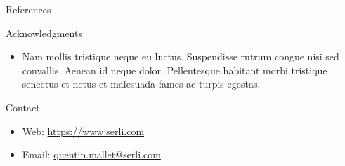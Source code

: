 \documentclass[final,hyperref={pdfpagelabels=false}]{beamer}
\begin{document}
\begin{frame}[t]
\begin{columns}[t]
\begin{column}{.465\textwidth}
\begin{block}{References}
\nocite{*} %
\small{
}

\end{block}


\begin{block}{Acknowledgments}

\begin{itemize}
\item Nam mollis tristique neque eu luctus. Suspendisse rutrum congue nisi sed convallis. Aenean id neque dolor. Pellentesque habitant morbi tristique senectus et netus et malesuada fames ac turpis egestas.
\end{itemize}

\end{block}



\begin{block}{Contact}

\begin{itemize}
\item Web: \href{https://www.serli.com}{https://www.serli.com}
\item Email: \href{mailto:quentin.mallet@serli.com}{quentin.mallet@serli.com}
\end{itemize}

\end{block}


\end{column} %

\begin{column}{.015\textwidth}\end{column} %

\end{columns} %

\end{frame} %
\end{document}

